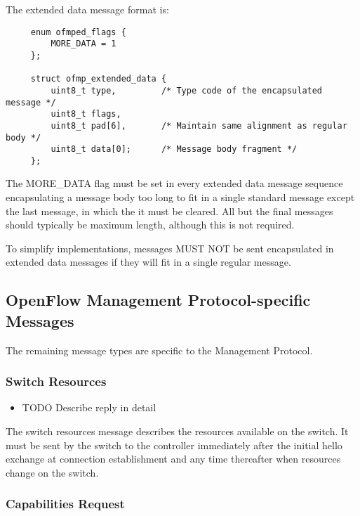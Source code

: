 \documentclass[11pt,a4paper]{article}
\begin{document}
   The extended data message format is:

{ \footnotesize

\begin{verbatim}
     enum ofmped_flags {
         MORE_DATA = 1
     };

     struct ofmp_extended_data {
         uint8_t type,         /* Type code of the encapsulated message */
         uint8_t flags,
         uint8_t pad[6],       /* Maintain same alignment as regular body */
         uint8_t data[0];      /* Message body fragment */
     };

\end{verbatim}


}

   The MORE\_{}DATA flag must be set in every extended data message
   sequence encapsulating a message body too long to fit in a single
   standard message except the last message, in which the it must be
   cleared.  All but the final messages should typically be maximum
   length, although this is not required.

   To simplify implementations, messages MUST NOT be sent encapsulated
   in extended data messages if they will fit in a single regular
   message.

\subsection{OpenFlow Management Protocol-specific Messages}
\label{sec-2.8}


   The remaining message types are specific to the Management Protocol.

\subsubsection{Switch Resources}
\label{sec-2.8.1}

\begin{itemize}
\item TODO Describe reply in detail
\end{itemize}
    The switch resources message describes the resources available on
    the switch.  It must be sent by the switch to the controller
    immediately after the initial hello exchange at connection
    establishment and any time thereafter when resources change on the
    switch.

\subsubsection{Capabilities Request}
\label{sec-2.8.2}
\end{document}
